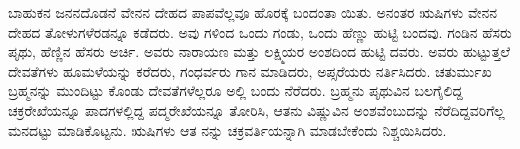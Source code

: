 ಬಾಹುಕನ ಜನನದೊಡನೆ ವೇನನ ದೇಹದ ಪಾಪವೆಲ್ಲವೂ ಹೊರಕ್ಕೆ ಬಂದಂತಾ ಯಿತು. ಅನಂತರ ಋಷಿಗಳು ವೇನನ ದೇಹದ ತೋಳುಗಳೆರಡನ್ನೂ ಕಡೆದರು. ಅವು ಗಳಿಂದ ಒಂದು ಗಂಡು, ಒಂದು ಹೆಣ್ಣು ಹುಟ್ಟಿ ಬಂದವು. ಗಂಡಿನ ಹೆಸರು ಪೃಥು, ಹೆಣ್ಣಿನ ಹೆಸರು ಅರ್ಚಿ. ಅವರು ನಾರಾಯಣ ಮತ್ತು ಲಕ್ಷ್ಮಿಯರ ಅಂಶದಿಂದ ಹುಟ್ಟಿ ದವರು. ಅವರು ಹುಟ್ಟುತ್ತಲೆ ದೇವತೆಗಳು ಹೂಮಳೆಯನ್ನು ಕರೆದರು, ಗಂಧರ್ವರು ಗಾನ ಮಾಡಿದರು, ಅಪ್ಸರೆಯರು ನರ್ತಿಸಿದರು. ಚತುರ್ಮುಖ ಬ್ರಹ್ಮನನ್ನು ಮುಂದಿಟ್ಟು ಕೊಂಡು ದೇವತೆಗಳೆಲ್ಲರೂ ಅಲ್ಲಿ ಬಂದು ನೆರೆದರು. ಬ್ರಹ್ಮನು ಪೃಥುವಿನ ಬಲಗೈಲಿದ್ದ ಚಕ್ರರೇಖೆಯನ್ನೂ ಪಾದಗಳಲ್ಲಿದ್ದ ಪದ್ಮರೇಖೆಯನ್ನೂ ತೋರಿಸಿ, ಆತನು ವಿಷ್ಣುವಿನ ಅಂಶವೆಂಬುದನ್ನು ನೆರೆದಿದ್ದವರಿಗೆಲ್ಲ ಮನದಟ್ಟು ಮಾಡಿಕೊಟ್ಟನು. ಋಷಿಗಳು ಆತ ನನ್ನು ಚಕ್ರವರ್ತಿಯನ್ನಾಗಿ ಮಾಡಬೇಕೆಂದು ನಿಶ್ಚಯಿಸಿದರು.

